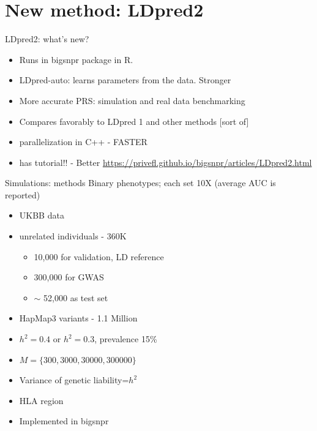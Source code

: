 \documentclass{beamer}
\begin{document}
  \section{New method: LDpred2}   
  \begin{frame}{LDpred2: what's new?}
    \begin{itemize}
        \item Runs in bigsnpr package in \alert{R}. 
        \item LDpred-auto: learns parameters from the data. \alert{Stronger}
        \item \alert{More accurate} PRS: simulation and real data benchmarking
        \item Compares favorably to LDpred 1 and other methods [sort of] 
        \item parallelization in C++ - \alert{FASTER}
        \item \alert{has tutorial}!! - \alert{Better} \url{https://privefl.github.io/bigsnpr/articles/LDpred2.html}
    \end{itemize}

  \end{frame}
    \begin{frame}[t]{Simulations: methods}
            Binary phenotypes; each set 10X (average AUC is reported)
        \begin{itemize}
         \item UKBB data
         \item unrelated individuals - 360K
          \begin{itemize}
                    \item 10,000 for validation, LD reference
                    \item 300,000 for GWAS
                    \item $\sim$ 52,000 as test set 
                    \end{itemize}
            
         \item HapMap3 variants - 1.1 Million

                  \item $h^2=0.4$ or $h^2=0.3$, prevalence 15\%
                  \item $M=\{300,3000,30000,300000\}$
                  \item Variance of genetic liability=$h^2$
                  \item HLA region
                  \item Implemented in bigsnpr
              \end{itemize}
    \end{frame}
    
\end{document}
